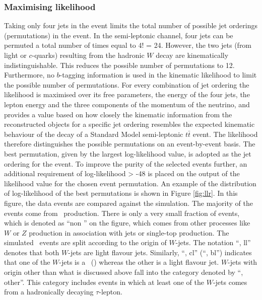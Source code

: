 \documentclass[letterpaper,12pt]{article}
\begin{document}
\subsubsection{Maximising likelihood}
Taking only four jets in the event limits the total number of possible 
jet orderings (permutations) in the event. In the semi-leptonic channel, 
four jets can be permuted a total number of times equal to 4! = 24. 
However, the two jets (from light or $c$-quarks) resulting from the 
hadronic $W$ decay are kinematically indistinguishable. This reduces 
the possible number of permutations to 12. Furthermore, no $b$-tagging 
information is used in the kinematic likelihood to limit the possible number of permutations.
For every combination of jet ordering the likelihood is maximised over 
its free parameters, the energy of the four jets, the lepton energy and 
the three components of the momentum of the neutrino, and provides a 
value based on how closely the kinematic information from the reconstructed 
objects for a specific jet ordering resembles the expected kinematic behaviour 
of the decay of a Standard Model semi-leptonic $t\bar{t}$ event. The likelihood 
therefore distinguishes the possible permutations on an event-by-event basis. 
The best permutation, given by the largest log-likelihood value, is adopted 
as the jet ordering for the event\cite{cjet}. To improve the purity of the 
selected events further, an additional requirement of log-likelihood > -48 is 
placed on the output of the likelihood value for the chosen event permutation. 
An example of the distribution of log-likelihood of the best permutations 
is shown in Figure \ref{fig:llr}. 
In this figure, the data events are compared against the simulation.
The majority of the events come from \ttbar\ production. There is only
a very small fraction of events, which is denoted as ``non \ttbar''
on the figure, which comes from other processes like $W$ or $Z$ production
in association with jets or single-top production. The simulated \ttbar\
events are split according to the origin of $W$-jets. The notation
``\ttbar, ll'' denotes that both $W$-jets are light flavour jets.
Similarly, ``\ttbar, cl'' (``\ttbar, bl'') 
indicates that one of the $W$-jets is a \cjet\ (\bjet)
whereas the other is a light flavour jet. $W$-jets with origin
other than what is discussed above fall into the 
category denoted by ``\ttbar, other''. This category includes
events in which at least one of the $W$-jets comes from a
hadronically decaying $\tau$-lepton. 
\end{document}
